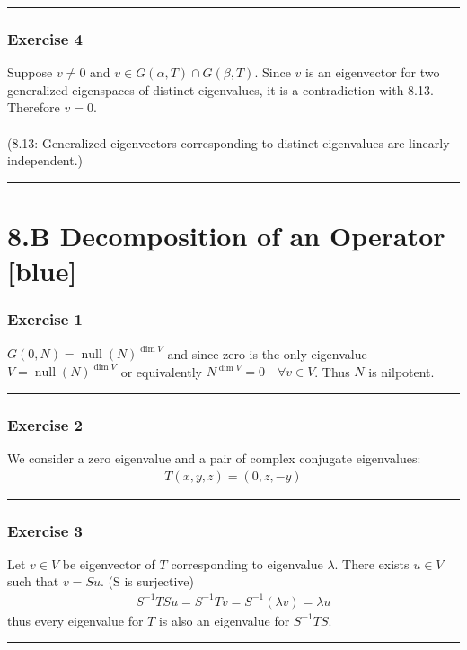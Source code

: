\documentclass[12pt, letterpaper]{scrartcl}
\DeclareMathOperator{\Null}{null}
\begin{document}
\vskip1mm\hrule

\subsubsection*{Exercise 4}
Suppose $v\neq0$ and $v\in G(\alpha, T)\cap G(\beta, T)$. Since $v$ is an eigenvector for two generalized eigenspaces of distinct eigenvalues, it is a contradiction with 8.13. Therefore $v=0$.\\\\
({\color{teal}8.13: Generalized eigenvectors corresponding to distinct eigenvalues are linearly independent.})
\vskip1mm\hrule




\section*{8.B Decomposition of an Operator \xrfill[2pt]{3pt}[blue]}

\subsubsection*{Exercise 1}
$G(0, N)=\Null(N)^{\dim V}$ and since zero is the only eigenvalue $V=\Null(N)^{\dim V}$ or equivalently $N^{\dim V}=0 \quad\forall v\in V$. Thus $N $ is nilpotent. 
\vskip1mm\hrule

\subsubsection*{Exercise 2}
We consider a zero eigenvalue and a pair of complex conjugate eigenvalues:
\begin{align*}
    T(x,y,z)=(0,z,-y)
\end{align*}
\vskip1mm\hrule

\subsubsection*{Exercise 3}
Let $v\in V$ be eigenvector of $T$ corresponding to eigenvalue $\lambda$. There exists $u\in V$ such that $v=Su$. (S is surjective)
\begin{align*}
    S^{-1}TSu=S^{-1}Tv=S^{-1}(\lambda v)=\lambda u
\end{align*}
thus every eigenvalue for $T$ is also an eigenvalue for $S^{-1}TS$.
\vskip1mm\hrule
\end{document}
